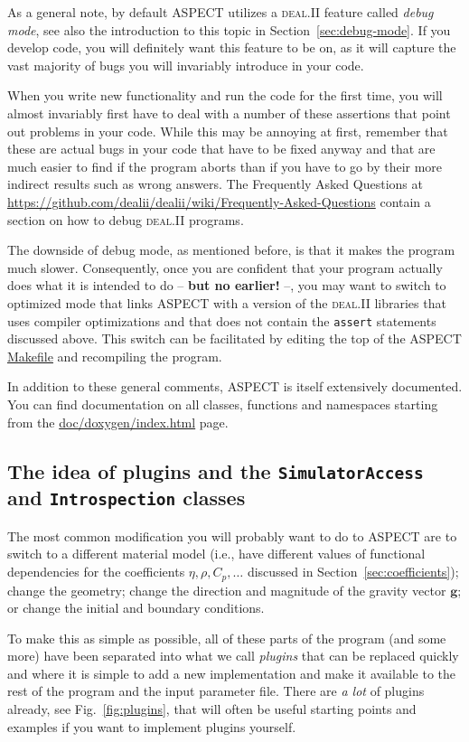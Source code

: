 \documentclass{article}
\newcommand{\dealii}{{\textsc{deal.II}}}
\newcommand{\aspect}{\textsc{ASPECT}}
\begin{document}
As a general note, by default \aspect{} utilizes a \dealii{} feature called \textit{debug
  mode}, see also the introduction to this topic in
Section~\ref{sec:debug-mode}. If you develop code, you will definitely want
this feature to be on, as it will capture the vast majority of bugs you
will invariably introduce in your code.

When you write new functionality and run
the code for the first time, you will almost invariably first have to deal
with a number of these assertions that point out problems in your code. While
this may be annoying at first, remember that these are actual bugs in your
code that have to be fixed anyway and that are much easier to find if the
program aborts than if you have to go by their more indirect results such as
wrong answers. The Frequently Asked Questions at
\url{https://github.com/dealii/dealii/wiki/Frequently-Asked-Questions}
contain a section on how to debug \dealii{} programs.

The downside of debug mode, as mentioned before, is that it makes the program
much slower. Consequently, once you are
confident that your program actually does what it is intended to do --
\textbf{but no earlier!} --, you may want to switch to optimized mode that
links \aspect{} with a version of the \dealii{} libraries that uses compiler
optimizations and that does not contain the \texttt{assert} statements
discussed above. This switch can be facilitated by editing the top of the
\aspect{} \url{Makefile} and recompiling the program.

In addition to these general comments, \aspect{} is itself extensively
documented. You can find documentation on all classes, functions and
namespaces starting from the \url{doc/doxygen/index.html} page.


\subsection{The idea of plugins and the \texttt{SimulatorAccess} and \texttt{Introspection} classes}
\label{sec:plugins}

The most common modification you will probably want to do to \aspect{} are to
switch to a different material model (i.e., have different values of
functional dependencies for the coefficients $\eta,\rho,C_p, \ldots$ discussed
in Section~\ref{sec:coefficients}); change the geometry; change the direction
and magnitude of the gravity vector $\mathbf g$; or change the initial and
boundary conditions.

To make this as simple as possible, all of these parts of the program (and some more) have
been separated into what we call \textit{plugins} that can be replaced quickly
and where it is simple to add a new implementation and make it available to the rest of the
program and the input parameter file. There are \textit{a lot} of plugins
already, see Fig.~\ref{fig:plugins}, that will often be useful starting points
and examples if you want to implement plugins yourself.
\end{document}
